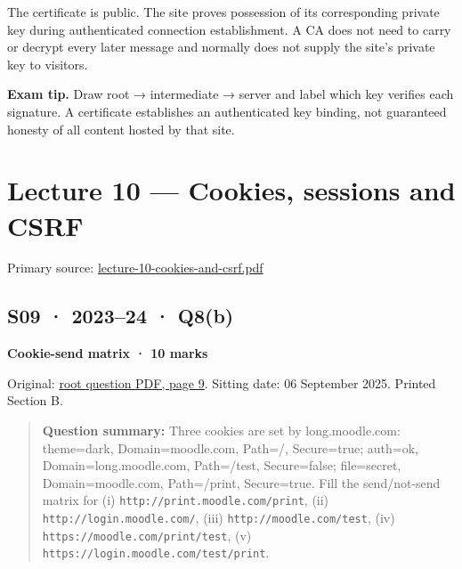 \documentclass[11pt,a4paper]{article}
\begin{document}
The certificate is public. The site proves possession of its corresponding private key during authenticated connection establishment. A CA does not need to carry or decrypt every later message and normally does not supply the site’s private key to visitors.



{\color{ForestGreen}\textbf{Exam tip.} Draw root → intermediate → server and label which key verifies each signature. A certificate establishes an authenticated key binding,\allowbreak{} not guaranteed honesty of all content hosted by that site.}



\clearpage
\section{Lecture 10 — Cookies,\allowbreak{} sessions and CSRF}

Primary source: \href{../slides/lecture-10-cookies-and-csrf.pdf}{lecture-10-cookies-and-csrf.\allowbreak{}pdf}




\subsection{S09 · 2023–24 · Q8(b)}\label{s09}

\textbf{Cookie-send matrix · 10 marks}


Original: \href{../../CSE405-Security_Merged.pdf\#page=9}{root question PDF,\allowbreak{} page 9}. Sitting date: 06 September 2025. Printed Section B.



\begin{quote}\small

\textbf{Question summary:} Three cookies are set by long.\allowbreak{}moodle.\allowbreak{}com: theme=\allowbreak{}dark,\allowbreak{} Domain=\allowbreak{}moodle.\allowbreak{}com,\allowbreak{} Path=\allowbreak{}/\allowbreak{},\allowbreak{} Secure=\allowbreak{}true; auth=\allowbreak{}ok,\allowbreak{} Domain=\allowbreak{}long.\allowbreak{}moodle.\allowbreak{}com,\allowbreak{} Path=\allowbreak{}/\allowbreak{}test,\allowbreak{} Secure=\allowbreak{}false; file=\allowbreak{}secret,\allowbreak{} Domain=\allowbreak{}moodle.\allowbreak{}com,\allowbreak{} Path=\allowbreak{}/\allowbreak{}print,\allowbreak{} Secure=\allowbreak{}true. Fill the send/\allowbreak{}not-send matrix for (i) \nolinkurl{http://print.moodle.com/print},\allowbreak{} (ii) \nolinkurl{http://login.moodle.com/},\allowbreak{} (iii) \nolinkurl{http://moodle.com/test},\allowbreak{} (iv) \nolinkurl{https://moodle.com/print/test},\allowbreak{} (v) \nolinkurl{https://login.moodle.com/test/print}.



\end{quote}
\end{document}
